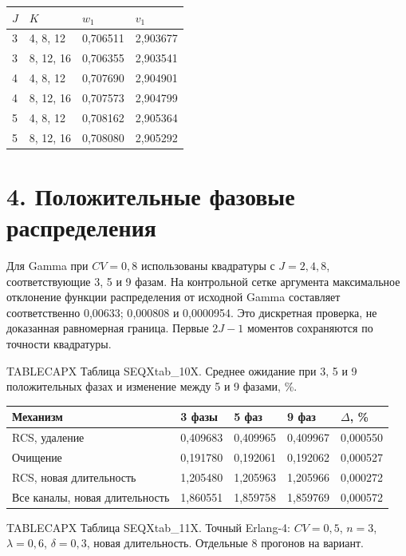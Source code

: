 \setlength{\tabcolsep}{2pt}
\begin{tabular}{p{1.42cm}p{4.72cm}p{4.72cm}p{4.72cm}}
\toprule
$J$ & $K$ & $w_1$ & $v_1$ \\
\midrule
3 & 4, 8, 12 & 0,706511 & 2,903677 \\
3 & 8, 12, 16 & 0,706355 & 2,903541 \\
4 & 4, 8, 12 & 0,707690 & 2,904901 \\
4 & 8, 12, 16 & 0,707573 & 2,904799 \\
5 & 4, 8, 12 & 0,708162 & 2,905364 \\
5 & 8, 12, 16 & 0,708080 & 2,905292 \\
\bottomrule
\end{tabular}






\section*{4. Положительные фазовые распределения}
Для Gamma при \(CV=0{,}8\) использованы квадратуры с \(J=2,4,8\), соответствующие 3, 5 и 9 фазам. На контрольной сетке аргумента максимальное отклонение функции распределения от исходной Gamma составляет соответственно 0{,}00633; 0{,}000808 и 0{,}0000954. Это дискретная проверка, не доказанная равномерная граница. Первые \(2J-1\) моментов сохраняются по точности квадратуры.

\noindent TABLECAPX Таблица SEQXtab_10X. Среднее ожидание при 3, 5 и 9 положительных фазах и изменение между 5 и 9 фазами, \%.\par

\setlength{\tabcolsep}{2pt}
\begin{tabular}{p{5.76cm}p{2.55cm}p{2.55cm}p{2.55cm}p{2.17cm}}
\toprule
Механизм & 3 фазы & 5 фаз & 9 фаз & $\Delta$, \% \\
\midrule
RCS, удаление & 0,409683 & 0,409965 & 0,409967 & 0,000550 \\
Очищение & 0,191780 & 0,192061 & 0,192062 & 0,000527 \\
RCS, новая длительность & 1,205480 & 1,205963 & 1,205966 & 0,000272 \\
Все каналы, новая длительность & 1,860551 & 1,859758 & 1,859769 & 0,000572 \\
\bottomrule
\end{tabular}




\noindent TABLECAPX Таблица SEQXtab_11X. Точный Erlang-4: \(CV=0{,}5\), \(n=3\), \(\lambda=0{,}6\), \(\delta=0{,}3\), новая длительность. Отдельные 8 прогонов на вариант.\par


